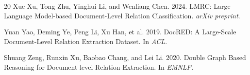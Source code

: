 \documentclass[11pt,a4paper]{article}
\begin{document}
\begin{thebibliography}{20}
Xue Xu, Tong Zhu, Yinghui Li, and Wenliang Chen. 2024.
\newblock LMRC: Large Language Model-based Document-Level Relation Classification.
\newblock \emph{arXiv preprint}.

Yuan Yao, Deming Ye, Peng Li, Xu Han, et al. 2019.
\newblock DocRED: A Large-Scale Document-Level Relation Extraction Dataset.
\newblock In \emph{ACL}.

Shuang Zeng, Runxin Xu, Baobao Chang, and Lei Li. 2020.
\newblock Double Graph Based Reasoning for Document-level Relation Extraction.
\newblock In \emph{EMNLP}.

\end{thebibliography}
\end{document}
